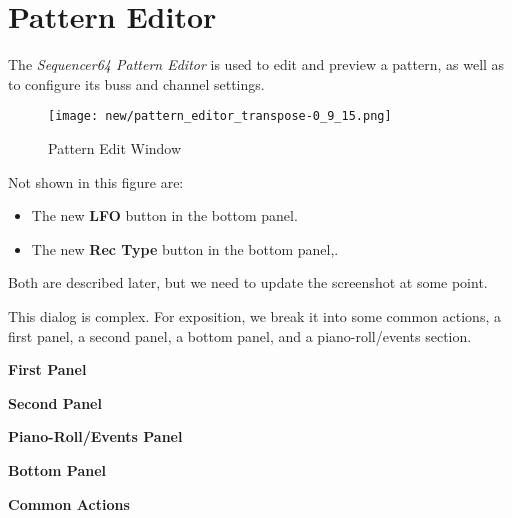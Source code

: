 %
%

\section{Pattern Editor}
\label{sec:seq64_pattern_editor}

   The \textsl{Sequencer64 Pattern Editor} is used to edit and preview a
   pattern, as well as to configure its buss and channel settings.


\begin{figure}[H]
   \centering 
   \texttt{[image: new/pattern\_editor\_transpose-0\_9\_15.png]}
   \caption{Pattern Edit Window}
   \label{fig:pattern_edit_window}
\end{figure}

   Not shown in this figure are:
   
   \begin{itemize}
      \item The new \textbf{LFO} button in the bottom panel.
      \item The new \textbf{Rec Type} button in the bottom panel,.
   \end{itemize}

   Both are described later, but we need to update the screenshot at some
   point.

   This dialog is complex.
   For exposition, we break it into some common actions, a first panel, a
   second panel, a bottom panel, and a piano-roll/events section.

   \begin{enumber}
      \item \textbf{First Panel}
      \item \textbf{Second Panel}
      \item \textbf{Piano-Roll/Events Panel}
      \item \textbf{Bottom Panel}
      \item \textbf{Common Actions}
   \end{enumber}

